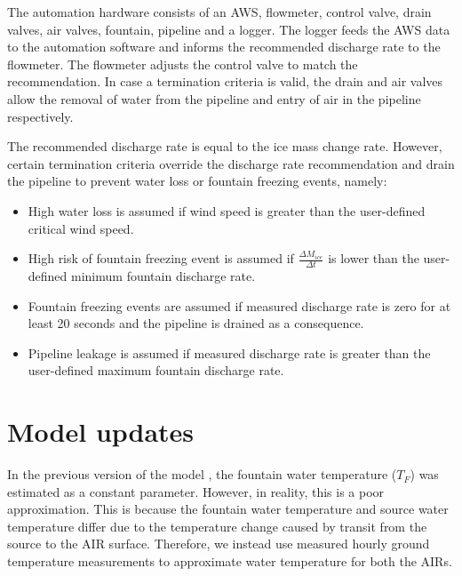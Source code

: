 \documentclass[tc, manuscript]{copernicus}
\begin{document}
The automation hardware consists of an AWS, flowmeter, control valve, drain valves, air valves, fountain,
pipeline and a logger. The logger feeds the AWS data to the automation software and informs the recommended
discharge rate to the flowmeter. The flowmeter adjusts the control valve to match the recommendation. In case a
termination criteria is valid, the drain and air valves allow the removal of water from the pipeline and entry
of air in the pipeline respectively.

The recommended discharge rate is equal to the ice mass change rate. However, certain termination criteria
override the discharge rate recommendation and drain the pipeline to prevent water loss or fountain freezing
events, namely: 

\begin{itemize}

\item High water loss is assumed if wind speed is greater than the user-defined critical wind speed.

\item High risk of fountain freezing event is assumed if $\frac{\Delta M_{ice}}{\Delta t}$ is lower than the user-defined minimum fountain discharge rate. 

\item Fountain freezing events are assumed if measured discharge rate is zero for at least 20 seconds and the pipeline is drained as a
  consequence.

\item Pipeline leakage is assumed if measured discharge rate is greater than the user-defined maximum fountain discharge rate.

\end{itemize}

\section{Model updates} \label{sec:Mod_updates}

In the previous version of the model \citep{balasubramanianInfluenceMeteorologicalConditions2022}, the fountain
water temperature ($T_F$) was estimated as a constant parameter. However, in reality, this is a poor
approximation. This is because the fountain water temperature and source water temperature differ due to the
temperature change caused by transit from the source to the  AIR surface. Therefore, we instead use measured
hourly ground temperature measurements to approximate water temperature for both the AIRs.
\end{document}
